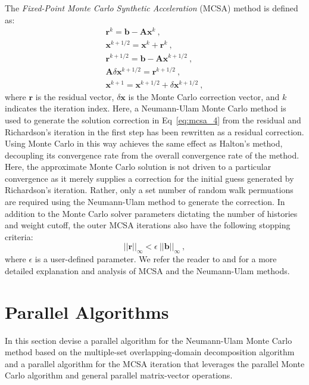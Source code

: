 \documentclass{snamc2013}
\begin{document}
The \textit{Fixed-Point Monte Carlo Synthetic Acceleration} (MCSA)
method is defined as:
\begin{subequations}
  \begin{gather}
    \label{eq:mcsa_1}
    \mathbf{r}^{k} = \mathbf{b} - \mathbf{A}\mathbf{x}^{k}\:,\\
    \label{eq:mcsa_2}
    \mathbf{x}^{k+1/2} = \mathbf{x}^k + \mathbf{r}^k\:,\\
    \label{eq:mcsa_3}
    \mathbf{r}^{k+1/2} = \mathbf{b} - \mathbf{A}\mathbf{x}^{k+1/2}\:,\\
    \label{eq:mcsa_4}
    \mathbf{A}\delta\mathbf{x}^{k+1/2} = \mathbf{r}^{k+1/2}\:,\\
    \label{eq:mcsa_5}
    \mathbf{x}^{k+1} = \mathbf{x}^{k+1/2} + \delta \mathbf{x}^{k+1/2}\:,
  \end{gather}
  \label{eq:mcsa}
\end{subequations}
where $\mathbf{r}$ is the residual vector, $\delta\mathbf{x}$ is the
Monte Carlo correction vector, and $k$ indicates the iteration
index. Here, a Neumann-Ulam Monte Carlo method is used to generate the
solution correction in Eq~\ref{eq:mcsa_4} from the residual and
Richardson's iteration in the first step has been rewritten as a
residual correction. Using Monte Carlo in this way achieves the same
effect as Halton's method, decoupling its convergence rate from the
overall convergence rate of the method. Here, the approximate Monte
Carlo solution is not driven to a particular convergence as it merely
supplies a correction for the initial guess generated by Richardson's
iteration. Rather, only a set number of random walk permuations are
required using the Neumann-Ulam method to generate the correction. In
addition to the Monte Carlo solver parameters dictating the number of
histories and weight cutoff, the outer MCSA iterations also have the
following stopping criteria:
\begin{equation}
  ||\mathbf{r}||_\infty < \epsilon \ ||\mathbf{b}||_\infty\:,
  \label{eq:mcsa_stopping_criteria}
\end{equation}
where $\epsilon$ is a user-defined parameter. We refer the reader to
\cite{evans_monte_2012} and \cite{evans_monte_2009} for a more
detailed explanation and analysis of MCSA and the Neumann-Ulam
methods.

\section{Parallel Algorithms}
In this section devise a parallel algorithm for the Neumann-Ulam Monte
Carlo method based on the multiple-set overlapping-domain
decomposition algorithm and a parallel algorithm for the MCSA
iteration that leverages the parallel Monte Carlo algorithm and
general parallel matrix-vector operations.
\end{document}

